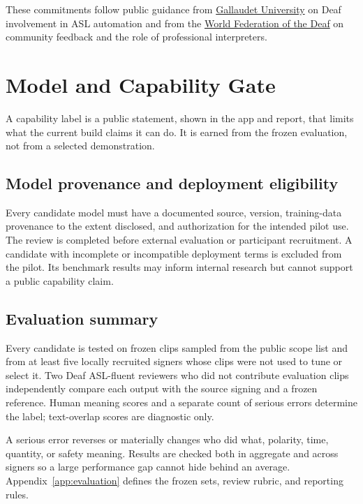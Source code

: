 \documentclass[11pt]{article}
\begin{document}
These commitments follow public guidance from
\href{https://gallaudet.edu/linguistics/position-statements/asl-and-ai-tools/}{Gallaudet University}
on Deaf involvement in ASL automation and from the
\href{https://wfdeaf.org/resources/consultation-on-good-practices-of-support-systems-enabling-community-inclusion-of-persons-with-disabilities/}{World Federation of the Deaf}
on community feedback and the role of professional interpreters.

\section{Model and Capability Gate}
\label{sec:model}

A capability label is a public statement, shown in the app and report, that limits
what the current build claims it can do. It is earned from the frozen evaluation, not
from a selected demonstration.

\subsection{Model provenance and deployment eligibility}

Every candidate model must have a documented source, version, training-data
provenance to the extent disclosed, and authorization for the intended pilot use.
The review is completed before external evaluation or participant recruitment. A
candidate with incomplete or incompatible deployment terms is excluded from the
pilot. Its benchmark results may inform internal research but cannot support a public
capability claim.

\subsection{Evaluation summary}

Every candidate is tested on frozen clips sampled from the public scope list and from
at least five locally recruited signers whose clips were not used to tune or select
it. Two Deaf ASL-fluent reviewers who did not contribute evaluation clips independently
compare each output with the source signing and a frozen reference. Human meaning
scores and a separate count of serious errors determine the label; text-overlap scores
are diagnostic only.

A serious error reverses or materially changes who did what, polarity, time,
quantity, or safety meaning. Results are checked both in aggregate and across signers
so a large performance gap cannot hide behind an average. Appendix~\ref{app:evaluation}
defines the frozen sets, review rubric, and reporting rules.
\end{document}
